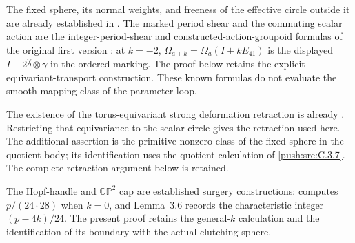 The fixed sphere, its normal weights, and freeness of the effective circle outside it are already established in \citet[Proposition~9.24 and Remark~9.25, pp.~82--83]{AC26}. The marked period shear and the commuting scalar action are the integer-period-shear and constructed-action-groupoid formulas of the original first version \citep[Section~7]{DGKXv1}: at $k=-2$, $\Omega_{a+k}=\Omega_a(I+kE_{41})$ is the displayed $I-2\widehat\delta\otimes\gamma$ in the ordered marking. The proof below retains the explicit equivariant-transport construction. These known formulas do not evaluate the smooth mapping class of the parameter loop.

The existence of the torus-equivariant strong deformation retraction is already \citet[Proposition~7.2, p.~41; proof completed on p.~50]{AC26}. Restricting that equivariance to the scalar circle gives the retraction used here. The additional assertion is the primitive nonzero class of the fixed sphere in the quotient body; its identification uses the quotient calculation of \cref{push:src:C.3.7}. The complete retraction argument below is retained.

The Hopf-handle and $\mathbb{CP}^2$ cap are established surgery constructions: \citet[Lemma~3.5, Case~2, manuscript pp.~13--15]{Jiang2014E} computes $p/(24\cdot28)$ when $k=0$, and Lemma~3.6 records the characteristic integer $(p-4k)/24$. The present proof retains the general-$k$ calculation and the identification of its boundary with the actual clutching sphere.
